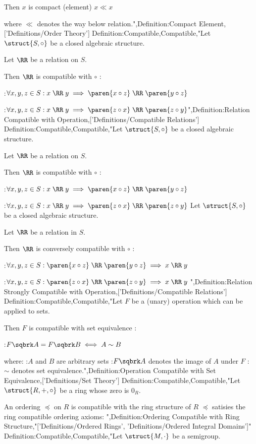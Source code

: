 Then $x$ is compact (element)  $x \ll x$

where $\ll$ denotes the way below relation.",Definition:Compact Element,['Definitions/Order Theory']
Definition:Compatible,Compatible,"Let $\struct {S, \circ}$ be a closed algebraic structure.

Let $\RR$ be a relation on $S$.


Then $\RR$ is compatible with $\circ$ :

:$\forall x, y, z \in S: x \mathrel \RR y \implies \paren {x \circ z} \mathrel \RR \paren {y \circ z}$

:$\forall x, y, z \in S: x \mathrel \RR y \implies \paren {z \circ x} \mathrel \RR \paren {z \circ y}$",Definition:Relation Compatible with Operation,['Definitions/Compatible Relations']
Definition:Compatible,Compatible,"Let $\struct {S, \circ}$ be a closed algebraic structure.

Let $\RR$ be a relation on $S$.


Then $\RR$ is compatible with $\circ$ :

:$\forall x, y, z \in S: x \mathrel \RR y \implies \paren {x \circ z} \mathrel \RR \paren {y \circ z}$

:$\forall x, y, z \in S: x \mathrel \RR y \implies \paren {z \circ x} \mathrel \RR \paren {z \circ y}$
Let $\struct {S, \circ}$ be a closed algebraic structure.

Let $\RR$ be a relation in $S$.


Then $\RR$ is conversely compatible with $\circ$ :

:$\forall x, y, z \in S: \paren {x \circ z} \mathrel \RR \paren {y \circ z} \implies x \mathrel \RR y$

:$\forall x, y, z \in S: \paren {z \circ x} \mathrel \RR \paren {z \circ y} \implies x \mathrel \RR y$
",Definition:Relation Strongly Compatible with Operation,['Definitions/Compatible Relations']
Definition:Compatible,Compatible,"Let $F$ be a (unary) operation which can be applied to sets.


Then $F$ is compatible with set equivalence :

:$F \sqbrk A = F \sqbrk B \iff A \sim B$

where:
:$A$ and $B$ are arbitrary sets
:$F \sqbrk A$ denotes the image of $A$ under $F$
:$\sim$ denotes set equivalence.",Definition:Operation Compatible with Set Equivalence,['Definitions/Set Theory']
Definition:Compatible,Compatible,"Let $\struct {R, +, \circ}$ be a ring whose zero is $0_R$.


An ordering $\preccurlyeq$ on $R$ is compatible with the ring structure of $R$  $\preccurlyeq$ satisies the ring compatible ordering axioms:
",Definition:Ordering Compatible with Ring Structure,"['Definitions/Ordered Rings', 'Definitions/Ordered Integral Domains']"
Definition:Compatible,Compatible,"Let $\struct {M, \cdot}$ be a semigroup.

